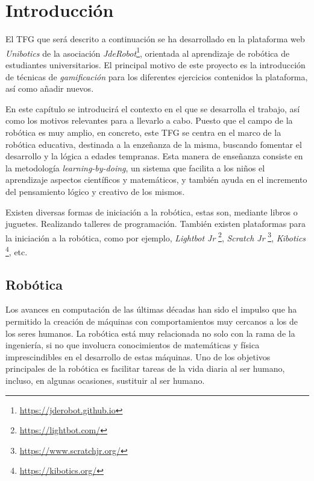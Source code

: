 \documentclass[a4paper, 12pt]{book}
\begin{document}

\cleardoublepage
\chapter{Introducción}
\label{sec:intro} %

El TFG que será descrito a continuación se ha desarrollado en la plataforma web \textit{Unibotics} de la asociación \textit{JdeRobot}\footnote{\url{https://jderobot.github.io}}, orientada al aprendizaje de robótica de estudiantes universitarios. El principal motivo de este proyecto es la introducción de técnicas de \emph{gamificación} para los diferentes ejercicios contenidos la plataforma, así como añadir nuevos.

En este capítulo se introducirá el contexto en el que se desarrolla el trabajo, así como los motivos relevantes para a llevarlo a cabo. Puesto que el campo de la robótica es muy amplio, en concreto, este TFG se centra en el marco de la robótica educativa, destinada a la enzeñanza de la misma, buscando fomentar el desarrollo y la lógica a edades tempranas. Esta manera de enseñanza consiste en la metodología \emph{learning-by-doing}, un sistema que facilita a los niños el aprendizaje aspectos científicos y matemáticos, y también ayuda en el incremento del pensamiento lógico y creativo de los mismos.

Existen diversas formas de iniciación a la robótica, estas son, mediante libros o juguetes. Realizando talleres de programación. También existen plataformas para la iniciación a la robótica, como por ejemplo, \emph{Lightbot Jr} \footnote{\url{https://lightbot.com/}}, \emph{Scratch Jr} \footnote{\url{https://www.scratchjr.org/}}, \emph{Kibotics} \footnote{\url{https://kibotics.org/}}, etc.

\section{Robótica}
\label{sec:robotica}


Los avances en computación de las últimas décadas han sido el impulso que ha permitido la creación de máquinas con comportamientos muy cercanos a los de los seres humanos. La robótica está muy relacionada no solo con la rama de la ingeniería, si no que involucra conocimientos de matemáticas y física imprescindibles en el desarrollo de estas máquinas. Uno de los objetivos principales de la robótica es facilitar tareas de la vida diaria al ser humano, incluso, en algunas ocasiones, sustituir al ser humano.
\end{document}
